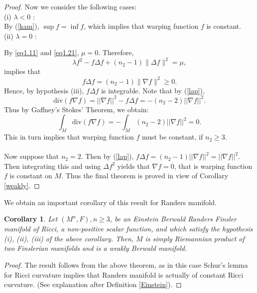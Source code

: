 \documentclass[pdflatex,sn-mathphys-num]{sn-jnl}%
\newtheorem{corollary}{Corollary}[section]
\theoremstyle{thmstyleone}%
\theoremstyle{thmstyletwo}%
\theoremstyle{thmstylethree}%
\begin{document}
\begin{proof}
	Now we consider the following cases:\\
	(i) $\lambda <0$ :\\ 
	By (\ref{kam}), $\sup f = \inf f$, which implies that warping function $f$ is constant.\\
	
	(ii) $\lambda=0$ :
	
	By \eqref{eq1.11} and \eqref{eq1.21}, $\mu=0$.
	Therefore,
	\begin{equation}
		\lambda f^2- f\Delta f + (n_2-1)\|\Delta f\|^2= \mu,
	\end{equation}
	implies that	
	\begin{equation}\label{lap}
		f\Delta f = (n_2-1)\|\nabla f\|^2 \ge 0.
	\end{equation}
Hence, by hypothesis (iii),  $f \Delta f$  
 is integrable.
	Note that by (\ref{lap}), 
 $$ \mbox{div}(f \nabla f) = ||\nabla f||^2 - f \Delta f =- (n_2 - 2) ||\nabla f||^2.$$ 
	 Thus by Gaffney's Stokes' Theorem, we obtain:
	$$\int_{M} \mbox{div}(f \nabla f) =-\int_{M} (n_2 - 2) ||\nabla f||^2 = 0.  $$
	This in turn implies that warping function $f$ must be constant, if $n_2 \geq 3$.\\\\
	Now suppose that $n_2 = 2$.  Then by (\ref{lap}),
 $f \Delta f = (n_2 - 1)  ||\nabla f||^2  = ||\nabla f||^2.$  
 Then integrating this and using $\Delta f^2$ yields that $\nabla f = 0$, that is warping function $f$ is constant on $M$.
Thus the final theorem is proved in view of Corollary \ref{weakly}.

 \end{proof}


We obtain an important corollary of this result for Randers manifold.

\vspace{0.15in}
	
	\begin{corollary}
	Let $(M^n,F), n \geq 3$, be an Einstein Berwald Randers  Finsler manifold of Ricci, a non-positive scalar function, and which
 satisfy the hypothesis (i), (ii), (iii) of the above corollary. 
 Then, $M$ is simply Riemannian product of two Finslerian manifolds and is a weakly Berwald manifold. 
	\end{corollary}
	\begin{proof}
		The result follows from the above theorem, as in this case Schur's lemma for Ricci curvature 
		implies that Randers manifold is actually of constant Ricci curvature.
		(See explanation after Definition \ref{Einstein}).
	\end{proof}
\end{document}
